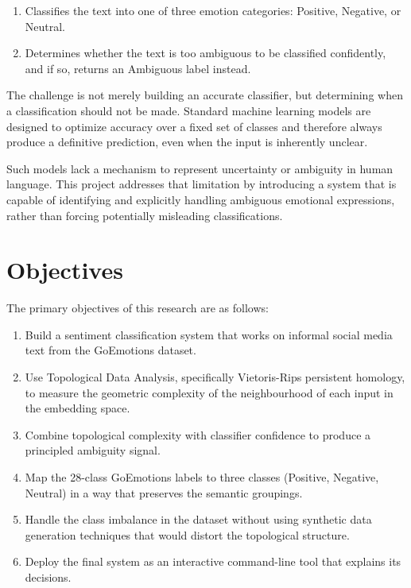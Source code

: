 \begin{enumerate}
    \item Classifies the text into one of three emotion categories: Positive, Negative, or
    Neutral.
    \item Determines whether the text is too ambiguous to be classified confidently, and if so,
    returns an Ambiguous label instead.
\end{enumerate}

The challenge is not merely building an accurate classifier, but determining when a
classification should not be made. Standard machine learning models are designed to optimize
accuracy over a fixed set of classes and therefore always produce a definitive prediction, even
when the input is inherently unclear.

Such models lack a mechanism to represent uncertainty or ambiguity in human language. This
project addresses that limitation by introducing a system that is capable of identifying and
explicitly handling ambiguous emotional expressions, rather than forcing potentially misleading
classifications.

\section{Objectives}

The primary objectives of this research are as follows:

\begin{enumerate}
    \item Build a sentiment classification system that works on informal social media text from
    the GoEmotions dataset.
    \item Use Topological Data Analysis, specifically Vietoris-Rips persistent homology, to
    measure the geometric complexity of the neighbourhood of each input in the embedding
    space.
    \item Combine topological complexity with classifier confidence to produce a principled
    ambiguity signal.
    \item Map the 28-class GoEmotions labels to three classes (Positive, Negative, Neutral)
    in a way that preserves the semantic groupings.
    \item Handle the class imbalance in the dataset without using synthetic data generation
    techniques that would distort the topological structure.
    \item Deploy the final system as an interactive command-line tool that explains its decisions.
\end{enumerate}

